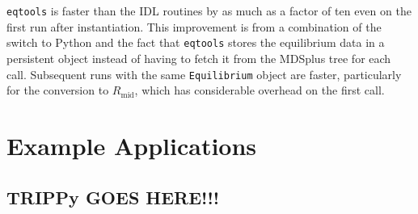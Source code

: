 \documentclass[12pt,floatfix,showpacs]{revtex4-1}
\newcommand{\eqtools}{\texttt{eqtools}\xspace}
\begin{document}
\eqtools is faster than the IDL routines by as much as a factor of ten even on the first run after instantiation.
This improvement is from a combination of the switch to Python and the fact that \eqtools stores the equilibrium data in a persistent object instead of having to fetch it from the MDSplus tree for each call.
Subsequent runs with the same \verb|Equilibrium| object are faster, particularly for the conversion to $R_{\text{mid}}$, which has considerable overhead on the first call.

\section{Example Applications}
\label{sec:examples}
\subsection{TRIPPy GOES HERE!!!}
\end{document}
